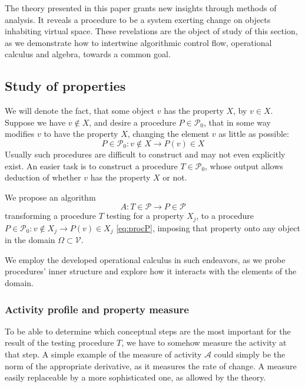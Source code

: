 \documentclass{article}
\newcommand{\VV}{\mathcal{V}}
\newcommand{\dP}{\mathcal{P}}
\begin{document}
   The theory presented in this paper grants new insights through methods of analysis. It reveals a procedure to be a system exerting change on objects inhabiting virtual space. These revelations are the object of study of this section, as we demonstrate how to intertwine algorithmic control flow, operational calculus and algebra, towards a common goal.  
  
  \subsection{Study of properties}
  
  We will denote the fact, that some object $v$ has the property $X$, by $v\in
  X$. Suppose we have $v\notin X$, and desire a procedure $P\in\dP_0$, that in
  some way modifies $v$ to have the property $X$, changing the element $v$ as
  little as possible: 
  \begin{equation}\label{eq:procP}
  P\in \dP_0:v\notin X\to P(v)\in X
  \end{equation}
  Usually such procedures are difficult to construct and may not even explicitly
  exist. An easier task is to construct a procedure $T\in\dP_0$, whose output
  allows deduction of whether $v$ has the property $X$ or not. 
  
   We propose an algorithm
   \begin{equation}\label{eq:algA}
     A:T\in\dP\to P\in\dP
     \end{equation}
     transforming a procedure $T$ testing for a property $X_j$, to a procedure
     $P\in \dP_0:v\notin X_j\to P(v)\in X_j$ \eqref{eq:procP}, imposing that
     property onto any object in the domain $\Omega\subset \VV$.
   
   We employ the developed operational calculus in such endeavors, as we probe
   procedures' inner structure and explore how it interacts with the elements of
   the domain.
 
\subsubsection{Activity profile and property measure}
    
To be able to determine which conceptual steps are the most important for the
result of the testing procedure $T$, we have to somehow measure the activity
at that step. A simple example of the measure of activity $\mathcal{A}$ could simply be the norm of the
appropriate derivative, as it measures the rate of change. A measure easily replaceable by a more sophisticated one, as allowed by the theory.
\end{document}
